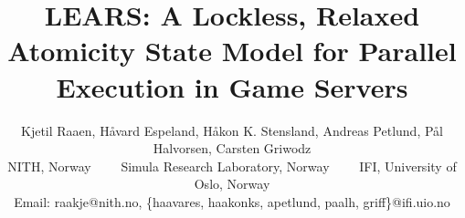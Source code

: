 \documentclass{sig-alternate-10pt}
\begin{document}
\title{LEARS: A Lockless, Relaxed Atomicity State Model for Parallel Execution in Game Servers}

\author{
  \large
  Kjetil Raaen, H{\aa}vard Espeland, H{\aa}kon K. Stensland,
  Andreas Petlund, P{\aa}l Halvorsen, Carsten Griwodz\\
  \large
  NITH, Norway \ \ \ \ Simula Research Laboratory, Norway \ \ \ \ 
  IFI, University of Oslo, Norway\\
  \large
  Email: raakje@nith.no, \{haavares, haakonks, apetlund, paalh, griff\}@ifi.uio.no
}


\maketitle













\end{document}

